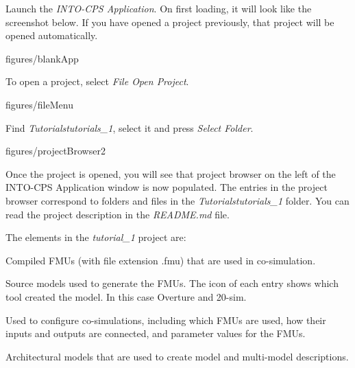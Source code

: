 \documentclass[11pt,a4paper]{../tutorial}
\begin{document}
\begin{instructions}
\item Launch the \emph{INTO-CPS Application}. On first loading, it will look like the screenshot below. If you have opened a project previously, that project will be opened automatically.

\begin{annotation}[width=0.85\linewidth]{figures/blankApp}
\end{annotation}

\item To open a project, select \emph{File \menusep Open Project}.

\begin{annotation}[width=0.85\linewidth,trim=0 260 0 0,clip]{figures/fileMenu}
\end{annotation}

\item Find \emph{Tutorials\pathsep{}tutorials\_1}, select it and press \emph{Select Folder}.

\begin{annotation}[width=0.85\linewidth]{figures/projectBrowser2}
\end{annotation}



\item Once the project is opened, you will see that project browser on the left of the INTO-CPS Application window is now populated. The entries in the project browser correspond to folders and files in the \emph{Tutorials\pathsep{}tutorials\_1} folder.
You can read the project description in the \emph{README.md} file.

    The elements in the \emph{tutorial\_1} project are:

    \begin{description}[noitemsep]
        \item[FMUs] Compiled FMUs (with file extension .fmu) that are used in co-simulation.
        \item[Models] Source models used to generate the FMUs. The icon of each entry shows which tool created the model. In this case Overture and 20-sim.
        \item[Multi-models] Used to configure co-simulations, including which FMUs are used, how their inputs and outputs are connected, and parameter values for the FMUs.
        \item[SysML] Architectural models that are used to create model and multi-model descriptions.
    \end{description}


\end{instructions}
\end{document}
